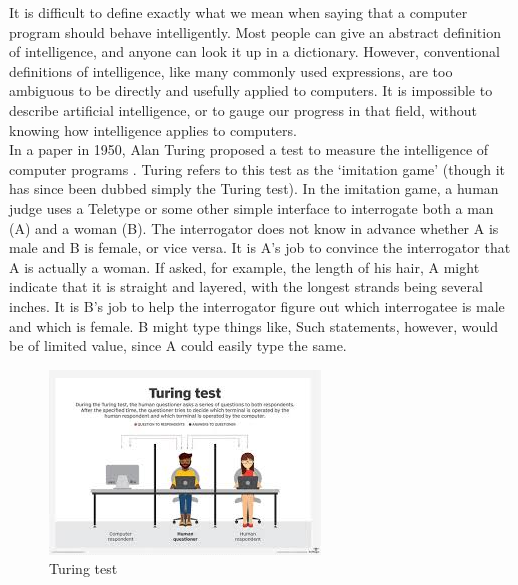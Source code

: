     It is difficult to define exactly what we mean when saying that a computer
program should behave intelligently. Most people can give an abstract definition of
intelligence, and anyone can look it up in a dictionary. However, conventional
definitions of intelligence, like many commonly used expressions, are too ambiguous to
be directly and usefully applied to computers. It is impossible to describe artificial
intelligence, or to gauge our progress in that field, without knowing how intelligence
applies to computers.\\
In a paper in 1950, Alan Turing proposed a test to measure the intelligence of
computer programs \cite{two}. Turing refers to this test as the ‘imitation game’ (though
it has since been dubbed simply the Turing test). In the imitation game, a human judge
uses a Teletype or some other simple interface to interrogate both a man (A) and a
woman (B). The interrogator does not know in advance whether A is male and B is
female, or vice versa. It is A’s job to convince the interrogator that A is actually a
woman. If asked, for example, the length of his hair, A might indicate that it is straight
and layered, with the longest strands being several inches. It is B’s job to help the
interrogator figure out which interrogatee is male and which is female. B might type
things like,  Such statements, however, would be of
limited value, since A could easily type the same.\\

\begin{figure}[H]
    \centering
    \includegraphics{images/turing.jpg}
    \caption{Turing test}
    \label{fig:my_label}
\end{figure}

